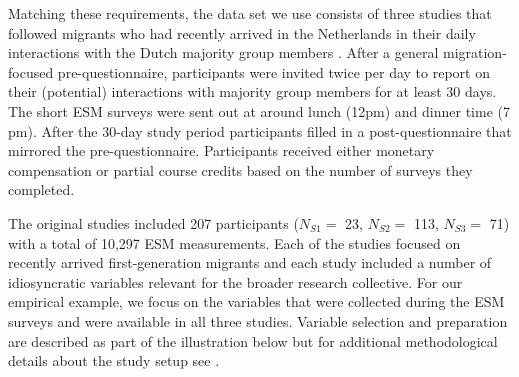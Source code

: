Matching these requirements, the data set we use consists of three
studies that followed migrants who had recently arrived in the
Netherlands in their daily interactions with the Dutch majority group
members \citep[for the data set see][]{Kreienkamp2022b}. After a general
migration-focused pre-questionnaire, participants were invited twice per
day to report on their (potential) interactions with majority group
members for at least 30 days. The short ESM surveys were sent out at
around lunch (12pm) and dinner time (7 pm). After the 30-day study
period participants filled in a post-questionnaire that mirrored the
pre-questionnaire. Participants received either monetary compensation or
partial course credits based on the number of surveys they completed.

The original studies included 207 participants (\(N_{S1}=\) 23,
\(N_{S2}=\) 113, \(N_{S3}=\) 71) with a total of 10,297 ESM
measurements. Each of the studies focused on recently arrived
first-generation migrants and each study included a number of
idiosyncratic variables relevant for the broader research collective.
For our empirical example, we focus on the variables that were collected
during the ESM surveys and were available in all three studies. Variable
selection and preparation are described as part of the illustration
below but for additional methodological details about the study setup
see \citet[][]{Kreienkamp2022b}.
